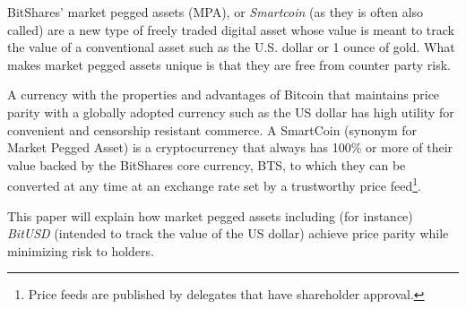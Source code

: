 BitShares' market pegged assets (MPA), or \emph{Smartcoin} (as they is often also
called) are a new type of freely traded digital asset whose value is meant to
track the value of a conventional asset such as the U.S. dollar or 1 ounce
of gold. What makes market pegged assets unique is that they are free from
counter party risk.

A currency with the properties and advantages of Bitcoin that maintains price
parity with a globally adopted currency such as the US dollar has high utility
for convenient and censorship resistant commerce. A SmartCoin (synonym for
Market Pegged Asset) is a cryptocurrency that always has 100\% or more of
their value backed by the BitShares core currency, BTS, to which they can be
converted at any time at an exchange rate set by a trustworthy price
feed\footnote{Price feeds are published by delegates that have shareholder
approval.}. 
 
This paper will explain how market pegged assets including (for instance)
\emph{BitUSD} (intended to track the value of the US dollar) achieve price
parity while minimizing risk to holders.
